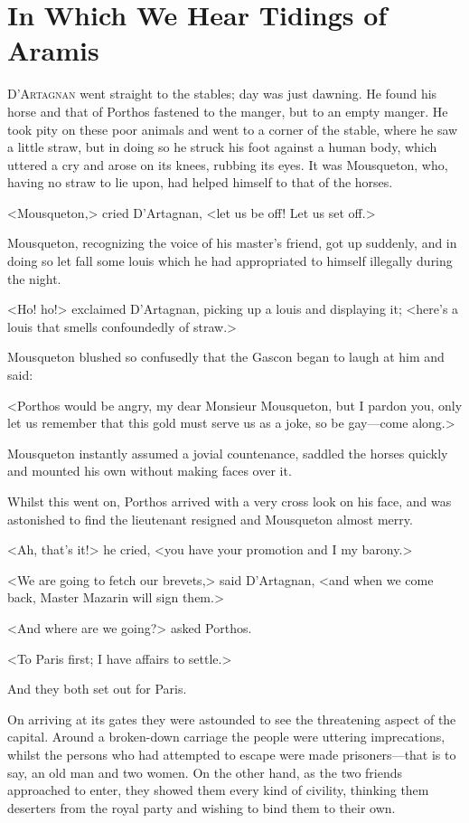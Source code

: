 \chapter{In Which We Hear Tidings of Aramis}

 \lettrine{D}{'Artagnan} went straight to the stables; day was just dawning. He found his horse and that of Porthos fastened to the manger, but to an empty manger. He took pity on these poor animals and went to a corner of the stable, where he saw a little straw, but in doing so he struck his foot against a human body, which uttered a cry and arose on its knees, rubbing its eyes. It was Mousqueton, who, having no straw to lie upon, had helped himself to that of the horses.

<Mousqueton,> cried D'Artagnan, <let us be off! Let us set off.>

Mousqueton, recognizing the voice of his master's friend, got up suddenly, and in doing so let fall some louis which he had appropriated to himself illegally during the night.

<Ho! ho!> exclaimed D'Artagnan, picking up a louis and displaying it; <here's a louis that smells confoundedly of straw.>

Mousqueton blushed so confusedly that the Gascon began to laugh at him and said:

<Porthos would be angry, my dear Monsieur Mousqueton, but I pardon you, only let us remember that this gold must serve us as a joke, so be gay—come along.>

Mousqueton instantly assumed a jovial countenance, saddled the horses quickly and mounted his own without making faces over it.

Whilst this went on, Porthos arrived with a very cross look on his face, and was astonished to find the lieutenant resigned and Mousqueton almost merry.

<Ah, that's it!> he cried, <you have your promotion and I my barony.>

<We are going to fetch our brevets,> said D'Artagnan, <and when we come back, Master Mazarin will sign them.>

<And where are we going?> asked Porthos.

<To Paris first; I have affairs to settle.>

And they both set out for Paris.

On arriving at its gates they were astounded to see the threatening aspect of the capital. Around a broken-down carriage the people were uttering imprecations, whilst the persons who had attempted to escape were made prisoners—that is to say, an old man and two women. On the other hand, as the two friends approached to enter, they showed them every kind of civility, thinking them deserters from the royal party and wishing to bind them to their own.

